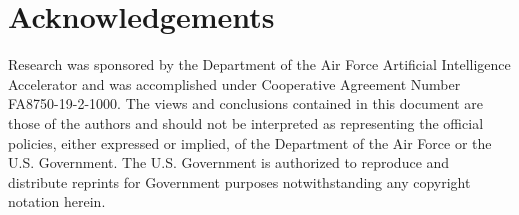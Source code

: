 \section{Acknowledgements}

Research was sponsored by the Department of the Air Force Artificial Intelligence Accelerator and was accomplished under Cooperative Agreement Number FA8750-19-2-1000. The views and conclusions contained in this document are those of the authors and should not be interpreted as representing the official policies, either expressed or implied, of the Department of the Air Force or the U.S. Government. The U.S. Government is authorized to reproduce and distribute reprints for Government purposes notwithstanding any copyright notation herein.
